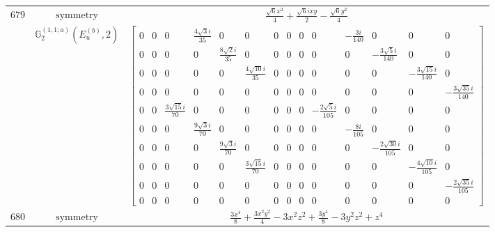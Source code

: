 \documentclass[fleqn,8pt,landscape]{jsarticle}
\begin{document}
\begin{longtable}{ccc}
$ 679 $ & $ \text{symmetry} $ & $ \frac{\sqrt{6} x^{2}}{4} + \frac{\sqrt{6} i x y}{2} - \frac{\sqrt{6} y^{2}}{4} $ \\
$  $ & $ \mathbb{G}_{2}^{(1,1;a)}(E_{u}^{(b)},2) $ & $ \begin{bmatrix} 0 & 0 & 0 & \frac{4 \sqrt{3} i}{35} & 0 & 0 & 0 & 0 & 0 & 0 & - \frac{3 i}{140} & 0 & 0 & 0 \\ 0 & 0 & 0 & 0 & \frac{8 \sqrt{2} i}{35} & 0 & 0 & 0 & 0 & 0 & 0 & - \frac{3 \sqrt{5} i}{140} & 0 & 0 \\ 0 & 0 & 0 & 0 & 0 & \frac{4 \sqrt{10} i}{35} & 0 & 0 & 0 & 0 & 0 & 0 & - \frac{3 \sqrt{15} i}{140} & 0 \\ 0 & 0 & 0 & 0 & 0 & 0 & 0 & 0 & 0 & 0 & 0 & 0 & 0 & - \frac{3 \sqrt{35} i}{140} \\ 0 & 0 & \frac{3 \sqrt{15} i}{70} & 0 & 0 & 0 & 0 & 0 & 0 & - \frac{2 \sqrt{5} i}{105} & 0 & 0 & 0 & 0 \\ 0 & 0 & 0 & \frac{9 \sqrt{3} i}{70} & 0 & 0 & 0 & 0 & 0 & 0 & - \frac{8 i}{105} & 0 & 0 & 0 \\ 0 & 0 & 0 & 0 & \frac{9 \sqrt{3} i}{70} & 0 & 0 & 0 & 0 & 0 & 0 & - \frac{2 \sqrt{30} i}{105} & 0 & 0 \\ 0 & 0 & 0 & 0 & 0 & \frac{3 \sqrt{15} i}{70} & 0 & 0 & 0 & 0 & 0 & 0 & - \frac{4 \sqrt{10} i}{105} & 0 \\ 0 & 0 & 0 & 0 & 0 & 0 & 0 & 0 & 0 & 0 & 0 & 0 & 0 & - \frac{2 \sqrt{35} i}{105} \\ 0 & 0 & 0 & 0 & 0 & 0 & 0 & 0 & 0 & 0 & 0 & 0 & 0 & 0 \end{bmatrix} $ \\ \hline
$ 680 $ & $ \text{symmetry} $ & $ \frac{3 x^{4}}{8} + \frac{3 x^{2} y^{2}}{4} - 3 x^{2} z^{2} + \frac{3 y^{4}}{8} - 3 y^{2} z^{2} + z^{4} $ \\

\end{longtable}
\end{document}
